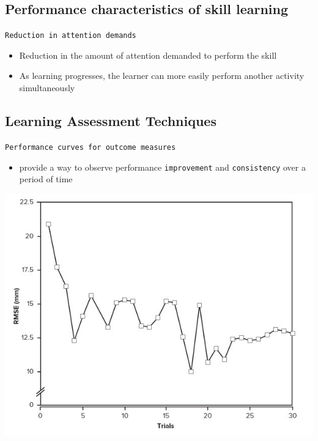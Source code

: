 \documentclass[
  letterpaper,
  DIV=11,
  numbers=noendperiod]{scrartcl}
\providecommand{\tightlist}{%
  \setlength{\itemsep}{0pt}\setlength{\parskip}{0pt}}\usepackage{longtable,booktabs,array}
\begin{document}
\hypertarget{performance-characteristics-of-skill-learning-5}{%
\subsection{Performance characteristics of skill
learning}\label{performance-characteristics-of-skill-learning-5}}

\texttt{Reduction\ in\ attention\ demands}

\begin{itemize}
\tightlist
\item
  Reduction in the amount of attention demanded to perform the skill
\item
  As learning progresses, the learner can more easily perform another
  activity simultaneously
\end{itemize}

\hypertarget{learning-assessment-techniques}{%
\subsection{Learning Assessment
Techniques}\label{learning-assessment-techniques}}

\texttt{Performance\ curves\ for\ outcome\ measures}

\begin{itemize}
\tightlist
\item
  provide a way to observe performance \texttt{improvement} and
  \texttt{consistency} over a period of time\hspace{0pt}
\end{itemize}

\includegraphics{images/Screenshot 2023-09-11 at 11.09.48 AM.png}
\end{document}

